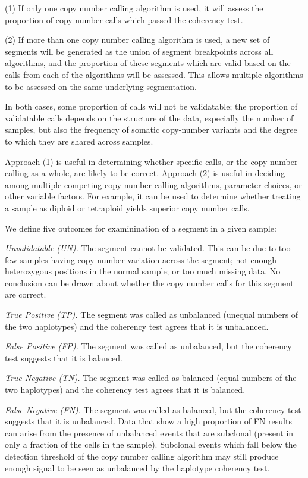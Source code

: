 \documentclass{article}
\begin{document}
(1)  If only one copy number calling algorithm is used, it will
assess the proportion of copy-number calls which passed the coherency
test.

(2)  If more than one copy number calling algorithm is used, a
new set of segments will be generated as the union of segment
breakpoints across all algorithms, and the proportion of these
segments which are valid based on the calls from each of the
algorithms will be assessed.  This allows multiple algorithms
to be assessed on the same underlying segmentation.

In both cases, some proportion of calls will not be validatable;
the proportion of validatable calls depends on the structure of
the data, especially the number of samples, but also the
frequency of somatic copy-number variants and the degree to which
they are shared across samples.

Approach (1) is useful in determining whether specific calls, or
the copy-number calling as a whole, are likely to be correct.  Approach
(2) is useful in deciding among multiple competing copy number calling 
algorithms, parameter choices, or other variable factors.
For example, it can be used to determine whether treating 
a sample as diploid or tetraploid yields superior copy number calls.

We define five outcomes for examinination of a segment in a given
sample:

{\it Unvalidatable (UN).}  The segment cannot be validated.  This can be due
to too few samples having copy-number variation across the segment;
not enough heterozygous positions in the normal sample; or too much
missing data.  No conclusion can be drawn about whether the copy
number calls for this segment are correct.

{\it True Positive (TP).}  The segment was called as unbalanced (unequal numbers
of the two haplotypes) and the coherency test agrees that it is
unbalanced.

{\it False Positive (FP).}  The segment was called as unbalanced, but the
coherency test suggests that it is balanced.

{\it True Negative (TN).}  The segment was called as balanced (equal numbers
of the two haplotypes) and the coherency test agrees that it is
balanced.

{\it False Negative (FN).}  The segment was called as balanced, but the
coherency test suggests that it is unbalanced.  Data that show a high
proportion of FN results can arise from the presence of unbalanced
events that are subclonal (present in only a fraction of the cells in
the sample).  Subclonal events which fall below the detection threshold of
the copy number calling algorithm may still produce enough signal to be seen as
unbalanced by the haplotype coherency test.
\end{document}
